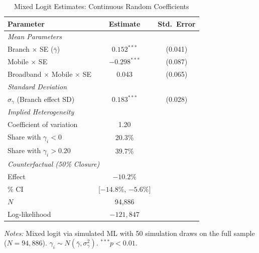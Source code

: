 \documentclass[12pt]{article}
\begin{document}
\begin{table}[H]
\centering
\caption{Mixed Logit Estimates: Continuous Random Coefficients}
\label{tab:mixed_logit}
\begin{threeparttable}
\begin{tabular}{lcc}
\toprule
Parameter & Estimate & Std.\ Error \\
\midrule
\multicolumn{3}{l}{\textit{Mean Parameters}} \\
\quad Branch $\times$ SE ($\bar{\gamma}$) & $0.152^{***}$ & (0.041) \\
\quad Mobile $\times$ SE & $-0.298^{***}$ & (0.087) \\
\quad Broadband $\times$ Mobile $\times$ SE & 0.043 & (0.065) \\
[4pt]
\multicolumn{3}{l}{\textit{Standard Deviation}} \\
\quad $\sigma_\gamma$ (Branch effect SD) & $0.183^{***}$ & (0.028) \\
[4pt]
\multicolumn{3}{l}{\textit{Implied Heterogeneity}} \\
\quad Coefficient of variation & 1.20 & \\
\quad Share with $\gamma_i < 0$ & 20.3\% & \\
\quad Share with $\gamma_i > 0.20$ & 39.7\% & \\
[4pt]
\multicolumn{3}{l}{\textit{Counterfactual (50\% Closure)}} \\
\quad Effect & $-10.2\%$ & \\
\quad 95\% CI & [$-14.8\%$, $-5.6\%$] & \\
\midrule
$N$ & 94,886 & \\
Log-likelihood & $-121{,}847$ & \\
\bottomrule
\end{tabular}
\begin{tablenotes}
\small
\item \textit{Notes:} Mixed logit via simulated ML with 50 simulation draws on the full sample ($N = 94{,}886$). $\gamma_i \sim N(\bar{\gamma}, \sigma^2_\gamma)$. $^{***}p<0.01$.
\end{tablenotes}
\end{threeparttable}
\end{table}
\end{document}

